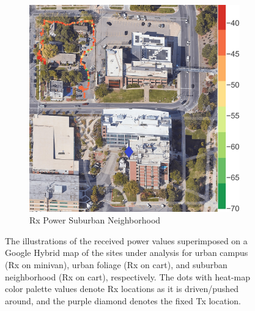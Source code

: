 \documentclass[10pt, twocolumn]{IEEEtran}
\begin{document}
\begin{figure} [t]
\begin{subfigure}{0.2579\linewidth}
         \centering
         \includegraphics[width=0.987\linewidth]{figs/rx_suburban_fraternities.jpg}
         \caption{Rx Power Suburban Neighborhood}
         \label{F4c}
     \end{subfigure}
     \vspace{-2mm}
     \caption{The illustrations of the received power values superimposed on a Google Hybrid map of the sites under analysis for urban campus (Rx on minivan), urban foliage (Rx on cart), and suburban neighborhood (Rx on cart), respectively. The dots with heat-map color palette values denote Rx locations as it is driven/pushed around, and the purple diamond denotes the fixed Tx location.}
     \label{F4}
     \vspace{-3mm}
\end{figure}
\end{document}
